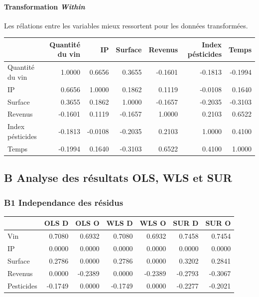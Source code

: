 \documentclass[11pt,]{article}
\let\oldparagraph\paragraph
\renewcommand{\paragraph}[1]{\oldparagraph{#1}\mbox{}}
\begin{document}
\FloatBarrier

\hypertarget{transformation-within-1}{%
\paragraph{\texorpdfstring{Transformation
\emph{Within}}{Transformation Within}}\label{transformation-within-1}}

Les rélations entre les variables mieux ressortent pour les données
transformées.

\FloatBarrier

\begin{longtable}[]{@{}lrrrrrr@{}}
\toprule
& Quantité du vin & IP & Surface & Revenus & Index pésticides &
Temps\tabularnewline
\midrule
\endhead
Quantité du vin & 1.0000 & 0.6656 & 0.3655 & -0.1601 & -0.1813 &
-0.1994\tabularnewline
IP & 0.6656 & 1.0000 & 0.1862 & 0.1119 & -0.0108 & 0.1640\tabularnewline
Surface & 0.3655 & 0.1862 & 1.0000 & -0.1657 & -0.2035 &
-0.3103\tabularnewline
Revenus & -0.1601 & 0.1119 & -0.1657 & 1.0000 & 0.2103 &
0.6522\tabularnewline
Index pésticides & -0.1813 & -0.0108 & -0.2035 & 0.2103 & 1.0000 &
0.4100\tabularnewline
Temps & -0.1994 & 0.1640 & -0.3103 & 0.6522 & 0.4100 &
1.0000\tabularnewline
\bottomrule
\end{longtable}

\FloatBarrier

\newpage

\hypertarget{b-analyse-des-resultats-ols-wls-et-sur}{%
\subsection{B Analyse des résultats OLS, WLS et
SUR}\label{b-analyse-des-resultats-ols-wls-et-sur}}

\hypertarget{b1-independance-des-residus}{%
\subsubsection{B1 Independance des
résidus}\label{b1-independance-des-residus}}

\FloatBarrier

\begin{longtable}[]{@{}lrrrrrr@{}}
\toprule
& OLS D & OLS O & WLS D & WLS O & SUR D & SUR O\tabularnewline
\midrule
\endhead
Vin & 0.7080 & 0.6932 & 0.7080 & 0.6932 & 0.7458 & 0.7454\tabularnewline
IP & 0.0000 & 0.0000 & 0.0000 & 0.0000 & 0.0000 & 0.0000\tabularnewline
Surface & 0.2786 & 0.0000 & 0.2786 & 0.0000 & 0.3202 &
0.2841\tabularnewline
Revenus & 0.0000 & -0.2389 & 0.0000 & -0.2389 & -0.2793 &
-0.3067\tabularnewline
Pesticides & -0.1749 & 0.0000 & -0.1749 & 0.0000 & -0.2277 &
-0.2021\tabularnewline
\bottomrule
\end{longtable}
\end{document}
